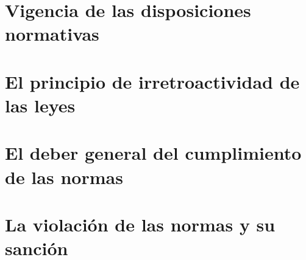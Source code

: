 \documentclass[a4paper,12pt]{report}
\begin{document}
\section{Vigencia de las disposiciones normativas}
\section{El principio de irretroactividad de las leyes}
\section{El deber general del cumplimiento de las normas}
\section{La violación de las normas y su sanción}
\end{document}
